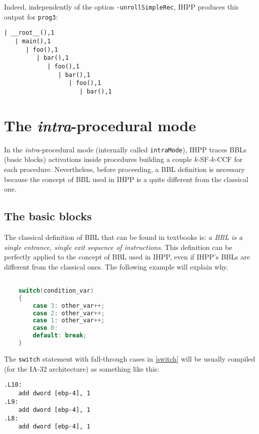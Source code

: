 \documentclass[a4paper,10pt]{report}
\begin{document}
\noindent
Indeed, independently of the option \verb|-unrollSimpleRec|,
IHPP produces this output for \verb|prog3|:
\begin{lstlisting}[label=out7, caption={IHPP partial output for \texttt{prog3}},frame=bottomline]
| __root__(),1
   | main(),1
      | foo(),1
         | bar(),1
            | foo(),1
               | bar(),1
                  | foo(),1
                     | bar(),1

\end{lstlisting}


\section{The \emph{intra}-procedural mode}

In the \emph{intra}-procedural mode (internally called \verb|intraMode|),
IHPP traces BBLs (basic blocks) activations inside procedures building a couple $k$-SF-$k$-CCF for each procedure. Nevertheless, before proceeding, a BBL definition is necessary
because the concept of BBL used in IHPP is a quite different from the classical one.

\subsection{The basic blocks}
The classical definition of BBL that can be found in textbooks is: \emph{a BBL is a single entrance, single exit sequence of instructions}.
This definition can be perfectly applied to the concept of BBL used in IHPP,
even if IHPP's BBLs are different from the classical ones.
The following example will explain why.

\begin{lstlisting}[language=C,
	caption={a switch statement}, label=switch, frame=leftline]

    switch(condition_var)
    {
        case 3: other_var++;
        case 2: other_var++;
        case 1: other_var++;
        case 0:
        default: break;
    }

\end{lstlisting}

\noindent
The \verb|switch| statement with fall-through cases in \cref{switch}
will be usually compiled (for the IA-32 architecture) as something like this:

\begin{lstlisting}[language={[x86masm]Assembler},
	frame=leftline, label=asm1, caption={assembly code relative to \cref{switch}}]
.L10:
	add dword [ebp-4], 1
.L9:
	add dword [ebp-4], 1
.L8:
	add dword [ebp-4], 1
\end{lstlisting}
\end{document}
